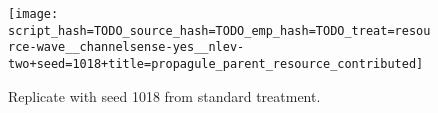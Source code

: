 \begin{figure}[!htbp]
\begin{center}

\texttt{[image: script\_hash=TODO\_source\_hash=TODO\_emp\_hash=TODO\_treat=resource-wave\_\_channelsense-yes\_\_nlev-two+seed=1018+title=propagule\_parent\_resource\_contributed]}
\caption{
Replicate with seed 1018 from standard treatment.
}
\label{fig:endowment}
\end{center}
\end{figure}
